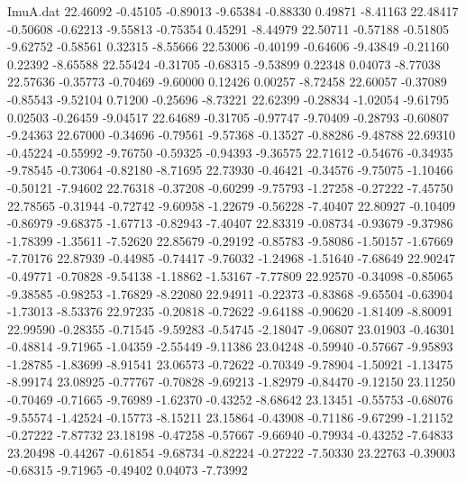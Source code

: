 \begin{filecontents}{ImuA.dat}
  22.46092   -0.45105   -0.89013   -9.65384   -0.88330    0.49871   -8.41163
  22.48417   -0.50608   -0.62213   -9.55813   -0.75354    0.45291   -8.44979
  22.50711   -0.57188   -0.51805   -9.62752   -0.58561    0.32315   -8.55666
  22.53006   -0.40199   -0.64606   -9.43849   -0.21160    0.22392   -8.65588
  22.55424   -0.31705   -0.68315   -9.53899    0.22348    0.04073   -8.77038
  22.57636   -0.35773   -0.70469   -9.60000    0.12426    0.00257   -8.72458
  22.60057   -0.37089   -0.85543   -9.52104    0.71200   -0.25696   -8.73221
  22.62399   -0.28834   -1.02054   -9.61795    0.02503   -0.26459   -9.04517
  22.64689   -0.31705   -0.97747   -9.70409   -0.28793   -0.60807   -9.24363
  22.67000   -0.34696   -0.79561   -9.57368   -0.13527   -0.88286   -9.48788
  22.69310   -0.45224   -0.55992   -9.76750   -0.59325   -0.94393   -9.36575
  22.71612   -0.54676   -0.34935   -9.78545   -0.73064   -0.82180   -8.71695
  22.73930   -0.46421   -0.34576   -9.75075   -1.10466   -0.50121   -7.94602
  22.76318   -0.37208   -0.60299   -9.75793   -1.27258   -0.27222   -7.45750
  22.78565   -0.31944   -0.72742   -9.60958   -1.22679   -0.56228   -7.40407
  22.80927   -0.10409   -0.86979   -9.68375   -1.67713   -0.82943   -7.40407
  22.83319   -0.08734   -0.93679   -9.37986   -1.78399   -1.35611   -7.52620
  22.85679   -0.29192   -0.85783   -9.58086   -1.50157   -1.67669   -7.70176
  22.87939   -0.44985   -0.74417   -9.76032   -1.24968   -1.51640   -7.68649
  22.90247   -0.49771   -0.70828   -9.54138   -1.18862   -1.53167   -7.77809
  22.92570   -0.34098   -0.85065   -9.38585   -0.98253   -1.76829   -8.22080
  22.94911   -0.22373   -0.83868   -9.65504   -0.63904   -1.73013   -8.53376
  22.97235   -0.20818   -0.72622   -9.64188   -0.90620   -1.81409   -8.80091
  22.99590   -0.28355   -0.71545   -9.59283   -0.54745   -2.18047   -9.06807
  23.01903   -0.46301   -0.48814   -9.71965   -1.04359   -2.55449   -9.11386
  23.04248   -0.59940   -0.57667   -9.95893   -1.28785   -1.83699   -8.91541
  23.06573   -0.72622   -0.70349   -9.78904   -1.50921   -1.13475   -8.99174
  23.08925   -0.77767   -0.70828   -9.69213   -1.82979   -0.84470   -9.12150
  23.11250   -0.70469   -0.71665   -9.76989   -1.62370   -0.43252   -8.68642
  23.13451   -0.55753   -0.68076   -9.55574   -1.42524   -0.15773   -8.15211
  23.15864   -0.43908   -0.71186   -9.67299   -1.21152   -0.27222   -7.87732
  23.18198   -0.47258   -0.57667   -9.66940   -0.79934   -0.43252   -7.64833
  23.20498   -0.44267   -0.61854   -9.68734   -0.82224   -0.27222   -7.50330
  23.22763   -0.39003   -0.68315   -9.71965   -0.49402    0.04073   -7.73992

\end{filecontents}
